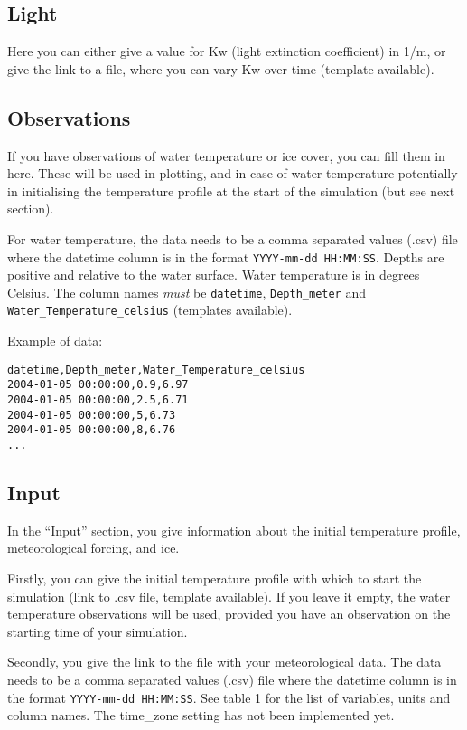 \documentclass[
]{article}
\begin{document}
\hypertarget{light}{%
\subsection{Light}\label{light}}

Here you can either give a value for Kw (light extinction coefficient)
in 1/m, or give the link to a file, where you can vary Kw over time
(template available).

\hypertarget{observations}{%
\subsection{Observations}\label{observations}}

If you have observations of water temperature or ice cover, you can fill
them in here. These will be used in plotting, and in case of water
temperature potentially in initialising the temperature profile at the
start of the simulation (but see next section).

For water temperature, the data needs to be a comma separated values
(.csv) file where the datetime column is in the format
\texttt{YYYY-mm-dd\ HH:MM:SS}. Depths are positive and relative to the
water surface. Water temperature is in degrees Celsius. The column names
\emph{must} be \texttt{datetime}, \texttt{Depth\_meter} and
\texttt{Water\_Temperature\_celsius} (templates available).

Example of data:

\begin{verbatim}
datetime,Depth_meter,Water_Temperature_celsius
2004-01-05 00:00:00,0.9,6.97
2004-01-05 00:00:00,2.5,6.71
2004-01-05 00:00:00,5,6.73
2004-01-05 00:00:00,8,6.76
...
\end{verbatim}

\hypertarget{input}{%
\subsection{Input}\label{input}}

In the ``Input'' section, you give information about the initial
temperature profile, meteorological forcing, and ice.

Firstly, you can give the initial temperature profile with which to
start the simulation (link to .csv file, template available). If you
leave it empty, the water temperature observations will be used,
provided you have an observation on the starting time of your
simulation.

Secondly, you give the link to the file with your meteorological data.
The data needs to be a comma separated values (.csv) file where the
datetime column is in the format \texttt{YYYY-mm-dd\ HH:MM:SS}. See
table 1 for the list of variables, units and column names. The
time\_zone setting has not been implemented yet.
\end{document}
